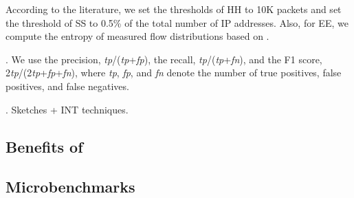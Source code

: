 According to the literature, we set the thresholds of HH to 10K packets and set the threshold of SS to 0.5\% of the total number of IP addresses. Also, for EE, we compute the entropy of measured flow distributions based on \cite{liu2016one}. 

. We use the precision, \emph{tp}/(\emph{tp}+\emph{fp}), the recall, \emph{tp}/(\emph{tp}+\emph{fn}), and the F1 score, 2\emph{tp}/(2\emph{tp}+\emph{fp}+\emph{fn}), where \emph{tp}, \emph{fp}, and \emph{fn} denote the number of true positives, false positives, and false negatives. 


. Sketches + INT techniques. 


\subsection{Benefits of \sysname}


\subsection{Microbenchmarks}


